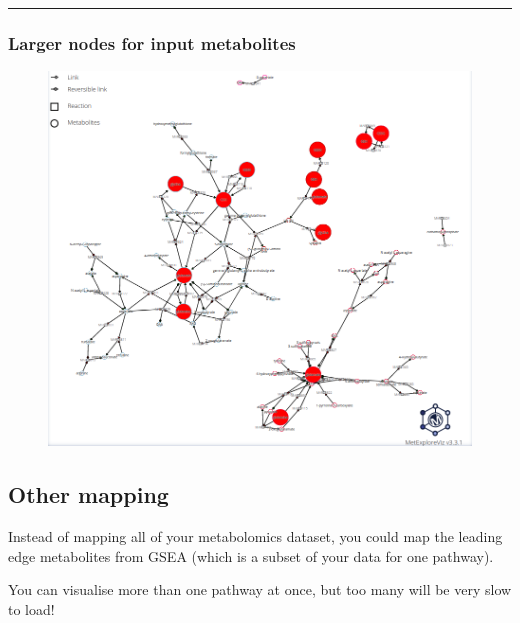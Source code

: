 \documentclass[
  24px,
  letterpaper,
  DIV=11,
  numbers=noendperiod]{scrartcl}
\begin{document}
\begin{figure}
\begin{minipage}[t]{0.50\linewidth}
{{}

}

\end{minipage}%

\end{figure}

\begin{center}\rule{0.5\linewidth}{0.5pt}\end{center}

\hypertarget{larger-nodes-for-input-metabolites}{%
\subsubsection{Larger nodes for input
metabolites}\label{larger-nodes-for-input-metabolites}}

\begin{figure}

{\centering \includegraphics{images/metexplore_viz_large.png}

}

\end{figure}

\hypertarget{other-mapping}{%
\subsection{Other mapping}\label{other-mapping}}

Instead of mapping all of your metabolomics dataset, you could map the
leading edge metabolites from GSEA (which is a subset of your data for
one pathway).

You can visualise more than one pathway at once, but too many will be
very slow to load!
\end{document}
